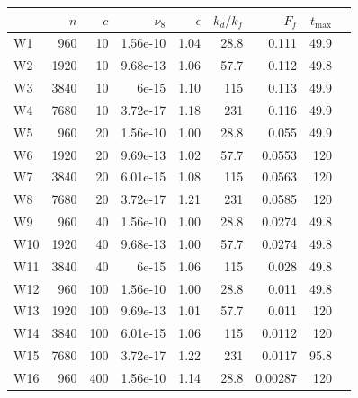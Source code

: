 \documentclass{jfm}
\begin{document}
\begin{table}
\begin{center}

\label{Table1}
\begin{tabular}{lrrrrrrrr}

\toprule
{} &   $n$ &  $c$ &  $\nu_8$ &  $\epsilon$ &  $ k_{d}  / {k_f} $ &   $F_f$ &    $t_{\max}$ \\
\midrule
W1  &   960 &   10 & 1.56e-10 &        1.04 &                    28.8 &   0.111 &                49.9 \\
W2  &  1920 &   10 & 9.68e-13 &        1.06 &                    57.7 &   0.112 &               49.8 \\
W3  &  3840 &   10 &    6e-15 &         1.10&                     115 &   0.113 &               49.9 \\
W4  &  7680 &   10 & 3.72e-17 &        1.18 &                     231 &   0.116 &               49.9 \\
W5  &   960 &   20 & 1.56e-10 &           1.00 &                    28.8 &   0.055 &              49.9 \\
W6  &  1920 &   20 & 9.69e-13 &        1.02 &                    57.7 &  0.0553 &                120 \\
W7  &  3840 &   20 & 6.01e-15 &        1.08 &                     115 &  0.0563 &                120 \\
W8  &  7680 &   20 & 3.72e-17 &        1.21 &                     231 &  0.0585 &                 120 \\
W9  &   960 &   40 & 1.56e-10 &          1.00 &                    28.8 &  0.0274 &                49.8 \\
W10 &  1920 &   40 & 9.68e-13 &       1.00 &                    57.7 &  0.0274 &               49.8 \\
W11 &  3840 &   40 &    6e-15 &        1.06 &                     115 &   0.028 &               49.8 \\
W12 &   960 &  100 & 1.56e-10 &       1.00 &                    28.8 &   0.011 &                49.8 \\
W13 &  1920 &  100 & 9.69e-13 &        1.01 &                    57.7 &   0.011 &                 120 \\
W14 &  3840 &  100 & 6.01e-15 &        1.06 &                     115 &  0.0112 &                 120 \\
W15 &  7680 &  100 & 3.72e-17 &        1.22 &                     231 &  0.0117 &                95.8 \\
W16 &   960 &  400 & 1.56e-10 &        1.14 &                    28.8 & 0.00287 &                 120 \\

\end{tabular}
\end{center}
\end{table}
\end{document}
